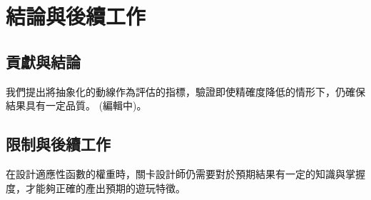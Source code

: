 \chapter{結論與後續工作}
\label{cha:conclusions}

\section{貢獻與結論}

我們提出將抽象化的動線作為評估的指標，驗證即使精確度降低的情形下，仍確保結果具有一定品質。 (編輯中)。

\section{限制與後續工作} 

在設計適應性函數的權重時，關卡設計師仍需要對於預期結果有一定的知識與掌握度，才能夠正確的產出預期的遊玩特徵。
